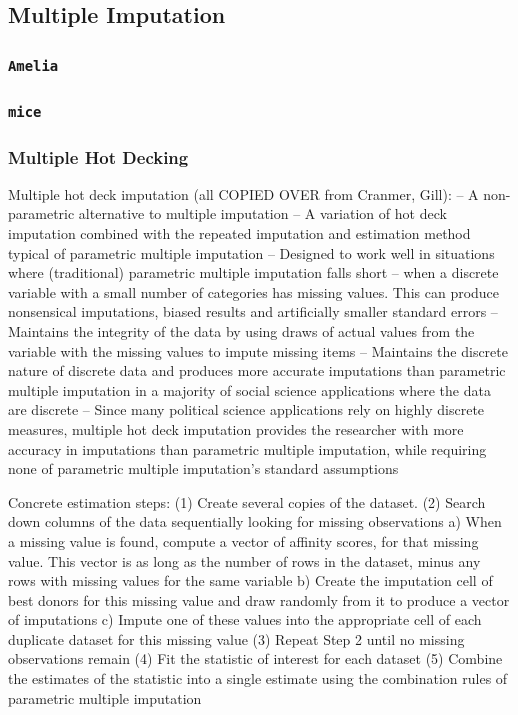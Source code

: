 \documentclass[12pt,econ]{sources/authesis}
\begin{document}
\hypertarget{ordmiss-theory-multimpute}{%
\subsection{Multiple Imputation}\label{ordmiss-theory-multimpute}}

\hypertarget{ordmiss-theory-multimpute-amelia}{%
\subsubsection{\texorpdfstring{\texttt{Amelia}}{Amelia}}\label{ordmiss-theory-multimpute-amelia}}

\hypertarget{ordmiss-theory-multimpute-mice}{%
\subsubsection{\texorpdfstring{\texttt{mice}}{mice}}\label{ordmiss-theory-multimpute-mice}}

\hypertarget{ordmiss-theory-multimpute-hdnorm}{%
\subsubsection{Multiple Hot Decking}\label{ordmiss-theory-multimpute-hdnorm}}

Multiple hot deck imputation (all COPIED OVER from Cranmer, Gill):
-- A non-parametric alternative to multiple imputation
-- A variation of hot deck imputation combined with the repeated imputation and estimation method typical of parametric multiple imputation
-- Designed to work well in situations where (traditional) parametric multiple imputation falls short -- when a discrete variable with a small number of categories has missing values. This can produce nonsensical imputations, biased results and artificially smaller standard errors
-- Maintains the integrity of the data by using draws of actual values from the variable with the missing values to impute missing items
-- Maintains the discrete nature of discrete data and produces more accurate imputations than parametric multiple imputation in a majority of social science applications where the data are discrete
-- Since many political science applications rely on highly discrete measures, multiple hot deck imputation provides the researcher with more accuracy in imputations than parametric multiple imputation, while requiring none of parametric multiple imputation's standard assumptions

Concrete estimation steps:
(1) Create several copies of the dataset.
(2) Search down columns of the data sequentially looking for missing observations
a) When a missing value is found, compute a vector of affinity scores, for that missing value. This vector is as long as the number of rows in the dataset, minus any rows with missing values for the same variable
b) Create the imputation cell of best donors for this missing value and draw randomly from it to produce a vector of imputations
c) Impute one of these values into the appropriate cell of each duplicate dataset for this missing value
(3) Repeat Step 2 until no missing observations remain
(4) Fit the statistic of interest for each dataset
(5) Combine the estimates of the statistic into a single estimate using the combination rules of parametric multiple imputation
\end{document}
